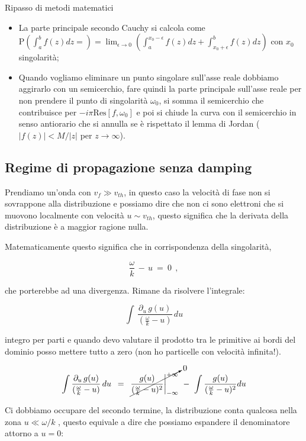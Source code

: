 \begin{approfondimento}{Ripasso di metodi matematici}
\begin{itemize}
		\[\oint_\Gamma f(z)\, dz\ =\ 2\pi\, i\, \sum_{k=1}^{N}\,\text{Res}[f(z),\, z_k]\] 
		\item La parte principale secondo Cauchy si calcola come $\text{P}\left(\int_a^b f(z) dz = \right)=\lim_{\epsilon \to 0}\left(\int_a^{x_0-\epsilon} f(z) dz +\int _{x_0+\epsilon}^b f(z) dz\right)$ con $x_0$ singolarità;
		\item Quando vogliamo eliminare un punto singolare sull'asse reale dobbiamo aggirarlo con un semicerchio, fare quindi la parte principale sull'asse reale per non prendere il punto di singolarità $\omega_0$, si somma il semicerchio che contribuisce per $-i\pi\text{Res}[f,\omega_0]$ e poi si chiude la curva con il semicerchio in senso antiorario che si annulla se è rispettato il lemma di Jordan ($|f(z)|<M/|z|$ per $z\to \infty$). 
	\end{itemize}
	
\end{approfondimento}


%
%
%
\subsection{Regime di propagazione senza damping} 

Prendiamo un'onda con $v_f\gg v_{th}$, in questo caso la velocità di fase non si sovrappone alla distribuzione e possiamo dire che non ci sono elettroni che si muovono localmente con velocità $u\sim v_{th}$, questo significa che la derivata della distribuzione è a maggior ragione nulla. 


Matematicamente questo significa che in corrispondenza della singolarità, 

\[\dfrac{\omega}{k}\,-\,u\ =\ 0\ \ ,\] 

che porterebbe ad una divergenza. Rimane da risolvere l'integrale:

\[\int\, \frac{\partial_u\, g(u)}{(\frac{\omega}{k}-u)}\, du\]  

integro per parti e quando devo valutare il prodotto  tra le primitive ai bordi del dominio posso mettere tutto a zero (non ho particelle con velocità infinita!). 

\[\int\frac{\partial_u\,g(u)}{(\frac{\omega}{k}-u)}\,du\ \, =\, \ \cancelto{0}{\frac{g(u)}{(\frac{\omega}{k}-u)^2}\bigg|_{-\infty}^{+\infty}}\ -\ \int \frac{g(u)}{(\frac{\omega}{k}-u)^2}du \]

Ci dobbiamo occupare del secondo termine, la distribuzione conta qualcosa nella zona  $\boxed{ u \ll \omega / k }$ , questo equivale a dire che possiamo espandere il denominatore attorno a $u=0$:

